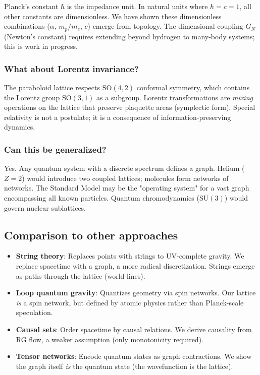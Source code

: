 \documentclass[aps,prd,twocolumn,superscriptaddress,groupedaddress,showpacs]{revtex4-2}
\newcommand{\SO}{\ensuremath{\text{SO}}}
\newcommand{\SU}{\ensuremath{\text{SU}}}
\begin{document}
Planck's constant $\hbar$ is the impedance unit. In natural units where $\hbar = c = 1$, all other constants are dimensionless. We have shown these dimensionless combinations ($\alpha$, $m_p/m_e$, $c$) emerge from topology. The dimensional coupling $G_N$ (Newton's constant) requires extending beyond hydrogen to many-body systems; this is work in progress.

\subsubsection{What about Lorentz invariance?}

The paraboloid lattice respects $\SO(4,2)$ conformal symmetry, which contains the Lorentz group $\SO(3,1)$ as a subgroup. Lorentz transformations are \emph{mixing} operations on the lattice that preserve plaquette areas (symplectic form). Special relativity is not a postulate; it is a consequence of information-preserving dynamics.

\subsubsection{Can this be generalized?}

Yes. Any quantum system with a discrete spectrum defines a graph. Helium ($Z=2$) would introduce two coupled lattices; molecules form networks of networks. The Standard Model may be the "operating system" for a vast graph encompassing all known particles. Quantum chromodynamics ($\SU(3)$) would govern nuclear sublattices.

\subsection{Comparison to other approaches}

\begin{itemize}
\item \textbf{String theory}: Replaces points with strings to UV-complete gravity. We replace spacetime with a graph, a more radical discretization. Strings emerge as paths through the lattice (world-lines).

\item \textbf{Loop quantum gravity}: Quantizes geometry via spin networks. Our lattice \emph{is} a spin network, but defined by atomic physics rather than Planck-scale speculation.

\item \textbf{Causal sets}: Order spacetime by causal relations. We derive causality from RG flow, a weaker assumption (only monotonicity required).

\item \textbf{Tensor networks}: Encode quantum states as graph contractions. We show the graph itself \emph{is} the quantum state (the wavefunction is the lattice).
\end{itemize}
\end{document}
